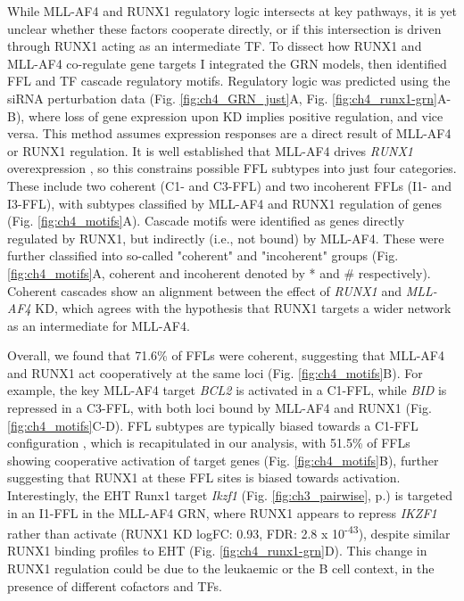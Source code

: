 While MLL-AF4 and RUNX1 regulatory logic intersects at key pathways, it is yet unclear whether these factors cooperate directly, or if this intersection is driven through RUNX1 acting as an intermediate TF. To dissect how RUNX1 and MLL-AF4 co-regulate gene targets I integrated the GRN models, then identified FFL and TF cascade regulatory motifs. Regulatory logic was predicted using the siRNA perturbation data (Fig. \ref{fig:ch4_GRN_just}A, Fig. \ref{fig:ch4_runx1-grn}A-B), where loss of gene expression upon KD implies positive regulation, and vice versa. This method assumes expression responses are a direct result of MLL-AF4 or RUNX1 regulation. It is well established that MLL-AF4 drives \textit{RUNX1} overexpression \citep{wilkinson_runx1_2013}, so this constrains possible FFL subtypes into just four categories. These include two coherent (C1- and C3-FFL) and two incoherent FFLs (I1- and I3-FFL), with subtypes classified by MLL-AF4 and RUNX1 regulation of genes \citep{mangan_structure_2003} (Fig. \ref{fig:ch4_motifs}A). Cascade motifs were identified as genes directly regulated by RUNX1, but indirectly (i.e., not bound) by MLL-AF4. These were further classified into so-called "coherent" and "incoherent" groups (Fig. \ref{fig:ch4_motifs}A, coherent and incoherent denoted by * and \# respectively). Coherent cascades show an alignment between the effect of \textit{RUNX1} and \textit{MLL-AF4} KD, which agrees with the hypothesis that RUNX1 targets a wider network as an intermediate for MLL-AF4.

Overall, we found that 71.6\% of FFLs were coherent, suggesting that MLL-AF4 and RUNX1 act cooperatively at the same loci (Fig. \ref{fig:ch4_motifs}B). For example, the key MLL-AF4 target \textit{BCL2} is activated in a C1-FFL, while \textit{BID} is repressed in a C3-FFL, with both loci bound by MLL-AF4 and RUNX1 (Fig. \ref{fig:ch4_motifs}C-D). FFL subtypes are typically biased towards a C1-FFL configuration \citep{joanito_incoherent_2018, mangan_incoherent_2006}, which is recapitulated in our analysis, with 51.5\% of FFLs showing cooperative activation of target genes (Fig. \ref{fig:ch4_motifs}B), further suggesting that RUNX1 at these FFL sites is biased towards activation. Interestingly, the EHT Runx1 target \textit{Ikzf1} (Fig. \ref{fig:ch3_pairwise}, p.\pageref{fig:ch3_pairwise}) is targeted in an I1-FFL in the MLL-AF4 GRN, where RUNX1 appears to repress \textit{IKZF1} rather than activate (RUNX1 KD logFC: 0.93, FDR: 2.8 x 10\textsuperscript{-43}), despite similar RUNX1 binding profiles to EHT (Fig. \ref{fig:ch4_runx1-grn}D). This change in RUNX1 regulation could be due to the leukaemic or the B cell context, in the presence of different cofactors and TFs.

